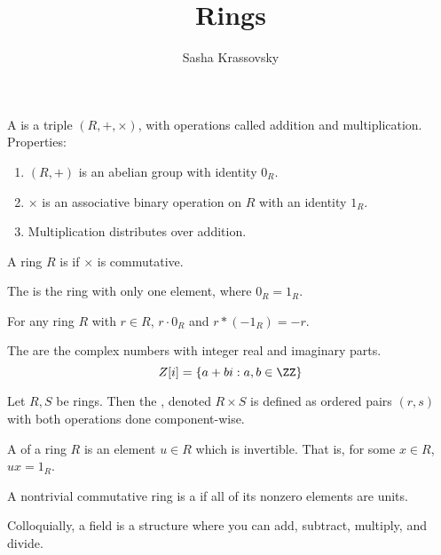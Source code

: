 \documentclass{article}
\title{Rings}
\author{Sasha Krassovsky}
\begin{document}
\maketitle

\begin{defn}
  A  is a triple $(R, +, \times)$, with operations called addition and
  multiplication. Properties:
  \begin{enumerate}
  \item $(R, +)$ is an abelian group with identity $0_R$.
  \item $\times$ is an associative binary operation on $R$ with an identity $1_R$.
  \item Multiplication distributes over addition.
  \end{enumerate}
  A ring $R$ is  if $\times$ is commutative.
\end{defn}

\begin{defn}
  The  is the ring with only one element, where $0_R = 1_R$. 
\end{defn}

\begin{fact}
  For any ring $R$ with $r \in R$, $r \cdot 0_R$ and $r * (-1_R) = -r$. 
\end{fact}

\begin{defn}
  The  are the complex numbers with integer real and imaginary parts.
  $$Z[i] = \{a + bi : a, b \in \ZZ\}$$
\end{defn}

\begin{defn}
  Let $R, S$ be rings. Then the , denoted $R \times S$ is defined
  as ordered pairs $(r, s)$ with both operations done component-wise. 
\end{defn}

\begin{defn}
  A  of a ring $R$ is an element $u \in R$ which is invertible. That is,
  for some $x \in R$, $ux = 1_R$. 
\end{defn}

\begin{defn}
  A nontrivial commutative ring is a  if all of its nonzero elements are units. 
\end{defn}
\begin{remark}
  Colloquially, a field is a structure where you can add, subtract, multiply, and divide.
\end{remark}
\end{document}
